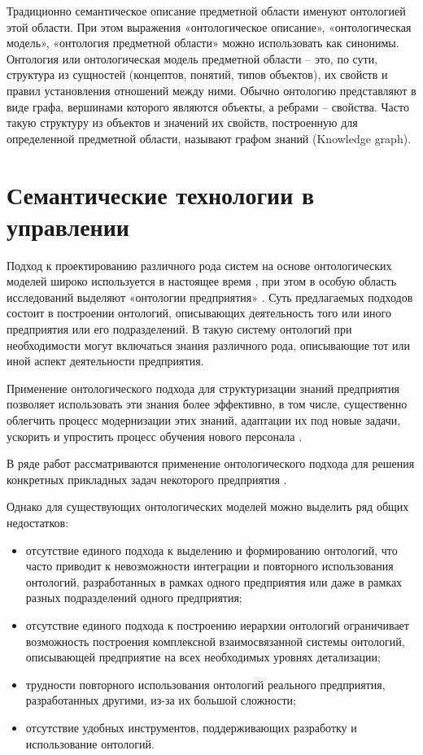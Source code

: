 Традиционно семантическое описание предметной области именуют онтологией этой области. При этом выражения «онтологическое описание», «онтологическая модель», «онтология предметной области» можно использовать как синонимы. Онтология или онтологическая модель предметной области – это, по сути, структура из сущностей (концептов, понятий, типов объектов), их свойств и правил установления отношений между ними. Обычно онтологию представляют в виде графа, вершинами которого являются объекты, а ребрами – свойства. Часто такую структуру из объектов и значений их свойств, построенную для определенной предметной области, называют графом знаний (Knowledge graph).

\section{Семантические технологии в управлении}

Подход к проектированию различного рода систем на основе онтологических моделей широко используется в настоящее время \cite{Боргест2010}, при этом в особую область исследований выделяют «онтологии предприятия» \cite{Шведин2010}. Суть предлагаемых подходов состоит в построении онтологий, описывающих деятельность того или иного предприятия или его подразделений. В такую систему онтологий при необходимости могут включаться знания различного рода, описывающие тот или иной аспект деятельности предприятия.

Применение онтологического подхода для структуризации знаний предприятия позволяет использовать эти знания более эффективно, в том числе, существенно облегчить процесс модернизации этих знаний, адаптации их под новые задачи, ускорить и упростить процесс обучения нового персонала \cite{Гладун2006}.

В ряде работ рассматриваются применение онтологического подхода для решения конкретных прикладных задач некоторого предприятия \cite{Загорулько2012}.

Однако для существующих онтологических моделей можно выделить ряд общих недостатков:

\begin{itemize}
    \item отсутствие единого подхода к выделению и формированию онтологий, что часто приводит к невозможности интеграции и повторного использования онтологий, разработанных в рамках одного предприятия или даже в рамках разных подразделений одного предприятия;
    \item отсутствие единого подхода к построению иерархии онтологий ограничивает возможность построения комплексной взаимосвязанной системы онтологий, описывающей предприятие на всех необходимых уровнях детализации;
    \item трудности повторного использования онтологий реального предприятия, разработанных другими, из-за их большой сложности;
    \item отсутствие удобных инструментов, поддерживающих разработку и использование онтологий.
\end{itemize}

